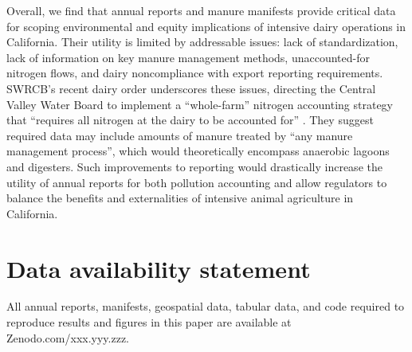\documentclass{iopjournal}
\begin{document}
Overall, we find that annual reports and manure manifests provide critical data for scoping environmental and equity implications of intensive dairy operations in California. Their utility is limited by addressable issues: lack of standardization, lack of information on key manure management methods, unaccounted-for nitrogen flows, and dairy noncompliance with export reporting requirements. SWRCB's recent dairy order underscores these issues, directing the Central Valley Water Board to implement a ``whole-farm'' nitrogen accounting strategy that ``requires all nitrogen at the dairy to be accounted for'' \cite{SWRCB_2026_Order}. They suggest required data may include amounts of manure treated by ``any manure management process'', which would theoretically encompass anaerobic lagoons and digesters. Such improvements to reporting would drastically increase the utility of annual reports for both pollution accounting and allow regulators to balance the benefits and externalities of intensive animal agriculture in California.





\section*{Data availability statement}
All annual reports, manifests, geospatial data, tabular data, and code required to reproduce results and figures in this paper are available at Zenodo.com/xxx.yyy.zzz.
\end{document}
